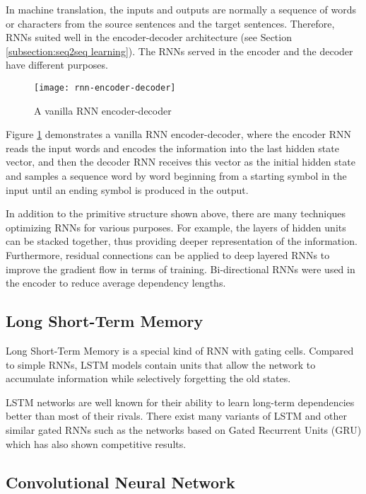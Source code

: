 In machine translation, the inputs and outputs are normally a sequence of words or characters from the source sentences and the target sentences. Therefore, RNNs suited well in the encoder-decoder architecture (see Section \ref{subsection:seq2seq learning}). The RNNs served in the encoder and the decoder have different purposes. 
\begin{figure}[h]
\texttt{[image: rnn-encoder-decoder]}
\centering
\caption{A vanilla RNN encoder-decoder}
\label{figure:vanilla rnn encoder-decoder}
\end{figure}
Figure \ref{figure:vanilla rnn encoder-decoder} demonstrates a vanilla RNN encoder-decoder, where the encoder RNN reads the input words and encodes the information into the last hidden state vector, and then the decoder RNN receives this vector as the initial hidden state and samples a sequence word by word beginning from a starting symbol in the input until an ending symbol is produced in the output.

In addition to the primitive structure shown above, there are many techniques optimizing RNNs for various purposes. For example, the layers of hidden units can be stacked together, thus providing deeper representation of the information. Furthermore, residual connections \cite{Wu2016} can be applied to deep layered RNNs to improve the gradient flow in terms of training. Bi-directional RNNs \cite{schuster1997bidirectional} were used in the encoder to reduce average dependency lengths.

\subsection{Long Short-Term Memory} \label{subsection:lstm}
Long Short-Term Memory is a special kind of RNN with gating cells. Compared to simple RNNs, LSTM models contain units that allow the network to accumulate information while selectively forgetting the old states. 



LSTM networks are well known for their ability to learn long-term dependencies better than most of their rivals. There exist many variants of LSTM and other similar gated RNNs such as the networks based on Gated Recurrent Units (GRU) which has also shown competitive results.

\subsection{Convolutional Neural Network} \label{subsection:cnn}

